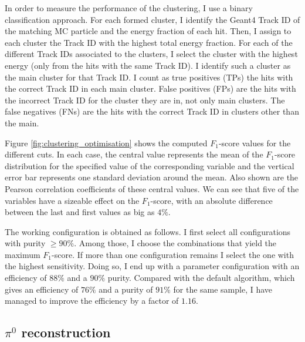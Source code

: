 In order to measure the performance of the clustering, I use a binary classification approach. For each formed cluster, I identify the Geant4 Track ID of the matching MC particle and the energy fraction of each hit. Then, I assign to each cluster the Track ID with the highest total energy fraction. For each of the different Track IDs associated to the clusters, I select the cluster with the highest energy (only from the hits with the same Track ID). I identify such a cluster as the main cluster for that Track ID. I count as true positives (TPs) the hits with the correct Track ID in each main cluster. False positives (FPs) are the hits with the incorrect Track ID for the cluster they are in, not only main clusters. The false negatives (FNs) are the hits with the correct Track ID in clusters other than the main.

Figure \ref{fig:clustering_optimisation} shows the computed $F_{1}$-score values for the different cuts. In each case, the central value represents the mean of the $F_{1}$-score distribution for the specified value of the corresponding variable and the vertical error bar represents one standard deviation around the mean. Also shown are the Pearson correlation coefficients of these central values. We can see that five of the variables have a sizeable effect on the $F_{1}$-score, with an absolute difference between the last and first values as big as $4\%$.

The working configuration is obtained as follows. I first select all configurations with purity $\geq90\%$. Among those, I choose the combinations that yield the maximum $F_{1}$-score. If more than one configuration remains I select the one with the highest sensitivity. Doing so, I end up with a parameter configuration with an efficiency of $88\%$ and a $90\%$ purity. Compared with the default algorithm, which gives an efficiency of $76\%$ and a purity of $91\%$ for the same sample, I have managed to improve the efficiency by a factor of $1.16$.

\subsection[\texorpdfstring{$\pi^{0}$}{pi0} reconstruction]{\boldmath\texorpdfstring{$\pi^{0}$}{pi0} reconstruction}

